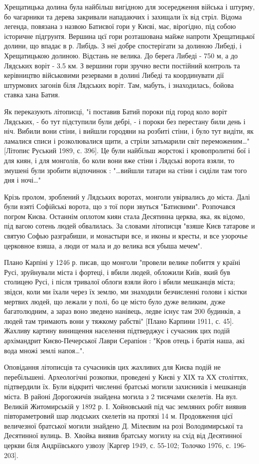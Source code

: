 Хрещатицька долина була найбільш вигідною для зосередження війська і штурму, бо
чагарники та дерева закривали нападаючих і захищали їх від стріл. Відома
легенда, повязана з назвою Батиєвої гори у Києві, має, вірогідно, під собою
історичне підгрунтя. Вершина цєї гори розташована майже напроти Хрещатицької
долини, що впадає в р. Либідь. З неї добре спостерігати за долиною Либеді, і
Хрещатицькою долиною. Відстань не велика. До берега Либеді - 750 м, а до
Лядських воріт - 3.5 км. З вершини гори зручно вести постійний контроль та
керівництво військовими резервами в долині Либеді та координувати дії штурмових
загонів біля Лядських воріт. Там, мабуть, і знаходилась, бойова ставка хана
Батия.

Як переказують літописці, "і поставив Батий пороки під город коло воріт
Лядських, - бо тут підступили були дебрі, - і пороки без перестану били день і
ніч. Вибили вони стіни, і вийшли городяни на розбиті стіни, і було тут видіти,
як ламалися списи і розколювалися щити, а стріли затьмарили світ переможеним…"
[Літопис Руський 1989, с. 396]. Це були найбільш жорстокі і кровопролитні бої і
для киян, і для монголів, бо коли вони вже стіни і Лядські ворота взяли, то
змушені були зробити відпочинок : "…вийшли татари на стіни і сиділи там того
дня і ночі…"

Крізь пролом, зроблений у Лядських воротах, монголи увірвались до міста. Далі
були взяті Софійські ворота, що з тої пори звуться "Батиєвими". Розпочався
погром Києва. Останнім оплотом киян стала Десятинна церква, яка, як відомо,
під вагою сотень людей обвалилась. За словами літописця "взяше Києв татарове и
святую Софью разграбиши, и монастыри все, и иконы и кресты, и все узорочье
церковное взяша, а люди от мала и до велика вся убыша мечем".

Плано Карпіні у 1246 р. писав, що монголи "провели велике побиття у країні
Русі, зруйнували міста і фортеці, і вбили людей, обложили Київ, який був
столицею Русі, і після тривалої облоги взяли його і вбили мешканців міста;
звідси, коли ми їхали через їх землю, ми знаходили безчисленні голови і кістки
мертвих людей, що лежали у полі, бо це місто було дуже великим, дуже
багатолюдним, а зараз воно зведено нанівець, ледве існує там 200 будинків, а
людей там тримають вони у тяжкому рабстві" [Плано Карпини 1911, с. 45]. Жахливу
картину винищення населення підтверджує і сучасник цих подій архімандрит
Києво-Печерської Лаври Серапіон : "Кров отець і братія наша, акі вода множі
землі напоя…".

Оповідання літописців та сучасників цих жахливих для Києва подій не
перебільшені. Археологічні розкопки, проведені у Києві у ХІХ та ХХ століттях,
підтвердили їх. Були відкриті численні братські могили захисників і мешканців
міста. В районі Дорогожичів знайдена могила з 2 тисячами скелетів. На вул.
Великій Житомирській у 1892 р. І. Хойновський під час земляних робіт виявив
півтораметровий шар людських скелетів на протязі 14 м. Продовження цієї
величезної братської могили знайдено Д. Мілеєвим на розі Володимирської та
Десятинної вулиць. В. Хвойка виявив братську могилу на схід від Десятинної
церкви біля Андріївського узвозу [Каргер 1949, с. 55-102; Толочко 1976, с.
196-203].

